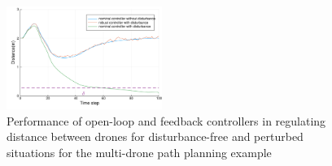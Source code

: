 \begin{figure}[t]
	\centering
	\includegraphics[width=0.45\textwidth]{figures/dist.pdf}
	\caption{Performance of open-loop and feedback controllers in regulating distance between drones for disturbance-free and perturbed situations for the multi-drone path planning example}
	\label{fig:multi_drone_distance}
\end{figure}



